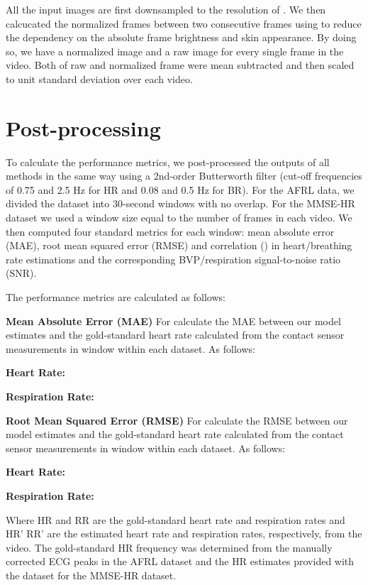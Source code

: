 \documentclass{article}
\begin{document}
All the input images are first downsampled to the resolution of . We then calcucated the normalized frames between two consecutive frames using 
 to reduce the dependency on the absolute frame brightness and skin appearance. By doing so, we have a normalized image and a raw image for every single frame in the video. Both of raw and normalized frame were mean subtracted and then scaled to unit standard deviation over each video.

\section{Post-processing}

To calculate the performance metrics, we post-processed the outputs of all methods in the same way using a 2nd-order Butterworth filter (cut-off frequencies of 0.75 and 2.5 Hz for HR and 0.08 and 0.5 Hz for BR). For the AFRL data, we divided the dataset into 30-second windows with no overlap. For the MMSE-HR dataset we used a window size equal to the number of frames in each video. We then computed four standard metrics for each window: mean absolute error (MAE), root mean squared error (RMSE) and correlation () in heart/breathing rate estimations and the corresponding BVP/respiration signal-to-noise ratio (SNR). 

The performance metrics are calculated as follows:

\textbf{Mean Absolute Error (MAE)} 
For calculate the MAE between our model estimates and the gold-standard heart rate calculated from the contact sensor measurements in window within each dataset. As follows:

\textbf{Heart Rate:}


\textbf{Respiration Rate:}



\textbf{Root Mean Squared Error (RMSE)} 
For calculate the RMSE between our model estimates and the gold-standard heart rate calculated from the contact sensor measurements in window within each dataset. As follows:

\textbf{Heart Rate:}


\textbf{Respiration Rate:}


Where HR and RR are the gold-standard heart rate and respiration rates and HR' RR' are the estimated heart rate and respiration rates, respectively, from the video. The gold-standard HR frequency was determined from the manually corrected ECG peaks in the AFRL dataset and the HR estimates provided with the dataset for the MMSE-HR dataset.
\end{document}
